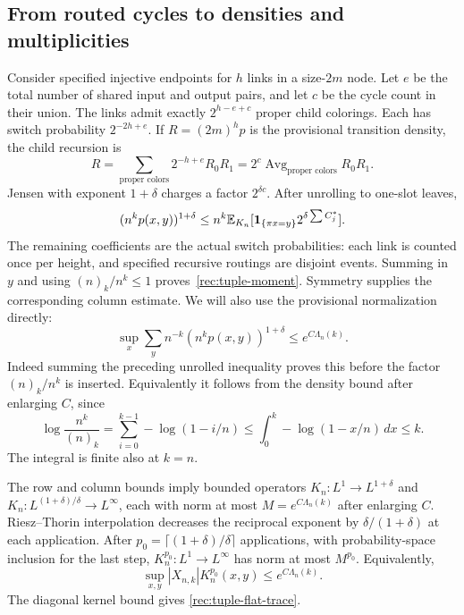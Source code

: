 \subsection{From routed cycles to densities and multiplicities}
Consider specified injective endpoints for $h$ links in a size-$2m$
node.  Let $e$ be the total number of shared input and output pairs,
and let $c$ be the cycle count in their union.  The links admit exactly
$2^{h-e+c}$ proper child colorings.  Each has switch probability
$2^{-2h+e}$.  If $R=(2m)^h p$ is the provisional transition density,
the child recursion is
\begin{equation}\label{rec:routing-density-recursion}
 R=\sum_{\text{proper colors}}2^{-h+e}R_0R_1
     =2^c\operatorname{Avg}_{\text{proper colors}}R_0R_1.
\end{equation}
Jensen with exponent $1+\delta$ charges a factor $2^{\delta c}$.
After unrolling to one-slot leaves,
\[
 (n^kp(x,y))^{1+\delta}
 \le n^k\mathbb E_{K_n}[\mathbf1_{\{\pi x=y\}}
                         2^{\delta\sum C_j^*}].
\]
The remaining coefficients are the actual switch probabilities: each
link is counted once per height, and specified recursive routings are
disjoint events.  Summing in $y$ and using
$(n)_k/n^k\le1$ proves~\eqref{rec:tuple-moment}.
Symmetry supplies the corresponding column estimate.  We will also use
the provisional normalization directly:
\begin{equation}\label{rec:provisional-moment}
 \sup_x\sum_y n^{-k}(n^kp(x,y))^{1+\delta}
 \le e^{C\Lambda_n(k)}.
\end{equation}
Indeed summing the preceding unrolled inequality proves this before the
factor $(n)_k/n^k$ is inserted.  Equivalently it follows from the density
bound after enlarging $C$, since
\[
 \log\frac{n^k}{(n)_k}
 =\sum_{i=0}^{k-1}-\log(1-i/n)
 \le\int_0^k-\log(1-x/n)\,dx\le k.
\]
The integral is finite also at $k=n$.

The row and column bounds imply bounded operators
$K_n:L^1\to L^{1+\delta}$ and
$K_n:L^{(1+\delta)/\delta}\to L^\infty$, each with norm at most
$M=e^{C\Lambda_n(k)}$ after enlarging $C$.
Riesz--Thorin interpolation decreases the reciprocal exponent by
$\delta/(1+\delta)$ at each application.  After
$p_0=\lceil(1+\delta)/\delta\rceil$ applications, with probability-space
inclusion for the last step, $K_n^{p_0}:L^1\to L^\infty$ has norm
at most $M^{p_0}$.  Equivalently,
\begin{equation}\label{rec:tuple-pointwise-smoothing}
 \sup_{x,y}|X_{n,k}|K_n^{p_0}(x,y)\le e^{C\Lambda_n(k)}.
\end{equation}
The diagonal kernel bound gives
\eqref{rec:tuple-flat-trace}.

